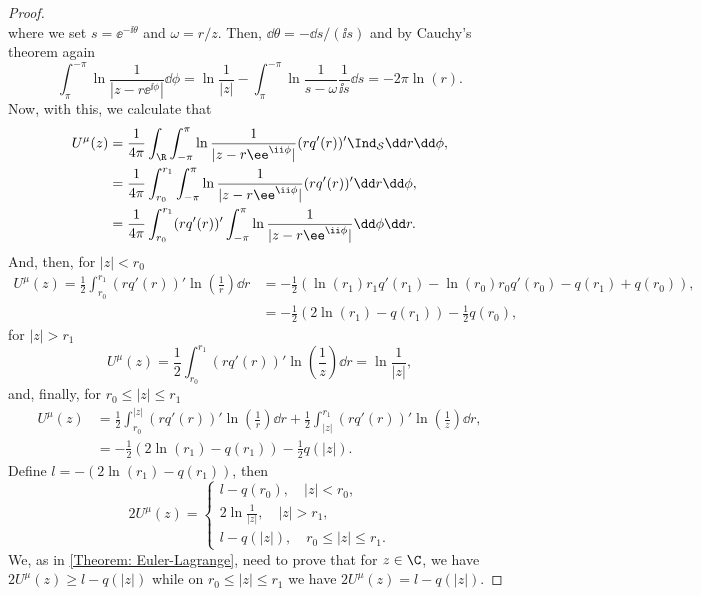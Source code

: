\begin{proof}
\begin{equation}
	\end{equation}
	where we set $ s = \ee^{-\ii \theta}$ and $\omega = r/z$. Then, $\dd \theta = - \dd s / (\ii s)$ and by Cauchy's theorem again
		\begin{equation}
		\int_{\pi}^{-\pi} \ln \frac{1}{|z - r\ee^{\ii \phi}|} \dd \phi  = \ln \frac{1}{|z|} - \int_{\pi}^{-\pi} \ln \frac{1}{s - \omega} \frac{1}{\ii s} \dd s = - 2\pi \ln(r).
	\end{equation}
	Now, with this, we calculate that
	\begin{align}
		U^{\mu}(z) & = \frac{1}{4\pi} \int_\R \int_{-\pi}^{\pi} \ln \frac{1}{|z - r\ee^{\ii \phi}|} (r q'(r))' \Ind_{\mathcal{S}} \dd r \dd \phi,\\ 
		& =  \frac{1}{4\pi} \int_{r_0}^{r_1} \int_{-\pi}^{\pi} \ln \frac{1}{|z - r\ee^{\ii \phi}|} (r q'(r))' \dd r \dd \phi, \\ 
		& =  \frac{1}{4\pi} \int_{r_0}^{r_1} (r q'(r))'  \int_{-\pi}^{\pi} \ln \frac{1}{|z - r\ee^{\ii \phi}|} \dd \phi \dd r.
	\end{align}
	And, then, for $|z| < r_0$
	\begin{align}
		U^{\mu}(z) =  \frac{1}{2} \int_{r_0}^{r_1} (r q'(r))'  \ln \left(\frac{1}{r}\right) \dd r & = - \frac{1}{2} (\ln(r_1)r_1 q'(r_1) - \ln(r_0)r_0 q'(r_0) - q(r_1) + q(r_0)),\\
		& = -\frac{1}{2}(2\ln(r_1) - q(r_1)) - \frac{1}{2}q(r_0),
	\end{align}
	for  $|z| > r_1$
	\begin{equation}
		U^{\mu}(z) =  \frac{1}{2} \int_{r_0}^{r_1} (r q'(r))'  \ln \left(\frac{1}{z}\right) \dd r = \ln \frac{1}{|z|},
	\end{equation}
	and, finally, for $r_0 \leq |z| \leq r_1$ 
	\begin{align}
		U^{\mu}(z) & =  \frac{1}{2} \int_{r_0}^{|z|} (r q'(r))'  \ln \left(\frac{1}{r}\right) \dd r + \frac{1}{2} \int_{|z|}^{r_1} (r q'(r))'  \ln \left(\frac{1}{z}\right) \dd r, \\
		& = -\frac{1}{2}(2 \ln(r_1) - q(r_1)) - \frac{1}{2} q(|z|).
	\end{align}
	Define $l = - (2 \ln(r_1) - q(r_1))$, then
	\begin{equation}
		2 U^{\mu}(z) =
		\begin{cases}
			l - q(r_0),  \quad |z| < r_0, \\
			2 \ln \frac{1}{|z|}, \quad |z| > r_1, \\
			l - q(|z|), \quad r_0 \leq |z| \leq r_1.
		\end{cases}
	\end{equation}
	We, as in \autoref{Theorem: Euler-Lagrange}, need to prove that for $z \in \C$, we have $2 U^{\mu}(z) \geq l - q(|z|)$ while on $r_0 \leq |z| \leq r_1$ we have $2 U^{\mu}(z) = l - q(|z|)$.
	

\end{proof}
